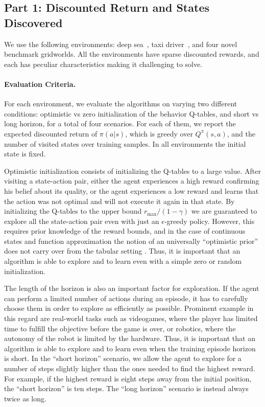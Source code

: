 \documentclass{article}
\begin{document}
\clearpage

\subsection{Part 1: Discounted Return and States Discovered}
\label{ssec:eval_part1}
We use the following environments: deep sea~\citep{osband2018randomized,osband2019deep}, taxi driver~\citep{asadi2017alternative}, and four novel benchmark gridworlds.
All the environments have sparse discounted rewards, and each has peculiar characteristics making it challenging to solve. 


\paragraph{Evaluation Criteria.} For each environment, we evaluate the algorithms on varying two different conditions: optimistic vs zero initialization of the behavior Q-tables, and short vs long horizon, for a total of four scenarios. 
For each of them, we report the expected discounted return of $\pi(a|s)$, which is greedy over $Q^\pi(s,a)$, and the number of visited states over training samples. In all environments the initial state is fixed.

Optimistic initialization \citep{lai1985asymptotically} consists of initializing the Q-tables to a large value. After visiting a state-action pair, either the agent experiences a high reward confirming his belief about its quality, or the agent experiences a low reward and learns that the action was not optimal and will not execute it again in that state. By initializing the Q-tables to the upper bound $r_{\max} / (1 - \gamma)$ we are guaranteed to explore all the state-action pair even with just an $\epsilon$-greedy policy. However, this requires prior knowledge of the reward bounds, and in the case of continuous states and function approximation the notion of an universally ``optimistic prior'' does not carry over from the tabular setting \citep{osband2019deep}. Thus, it is important that an algorithm is able to explore and to learn even with a simple zero or random initialization.

The length of the horizon is also an important factor for exploration. If the agent can perform a limited number of actions during an episode, it has to carefully choose them in order to explore as efficiently as possible. Prominent example in this regard are real-world tasks such as videogames, where the player has limited time to fulfill the objective before the game is over, or robotics, where the autonomy of the robot is limited by the hardware. Thus, it is important that an algorithm is able to explore and to learn even when the training episode horizon is short. In the ``short horizon'' scenario, we allow the agent to explore for a number of steps slightly higher than the ones needed to find the highest reward. For example, if the highest reward is eight steps away from the initial position, the ``short horizon'' is ten steps. The ``long horizon'' scenario is instead always twice as long.
\end{document}

